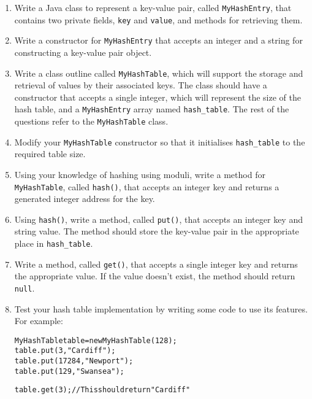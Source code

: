 \documentclass[11pt,a4paper]{report}
\begin{document}
\begin{enumerate}

\item Write a Java class to represent a key-value pair, called \texttt{MyHashEntry}, that contains two private fields, \texttt{key} and \texttt{value}, and methods for retrieving them.

\item Write a constructor for \texttt{MyHashEntry} that accepts an integer and a string for constructing a key-value pair object.

\item Write a class outline called \texttt{MyHashTable}, which will support the storage and retrieval of values by their associated keys. The class should have a constructor that accepts a single integer, which will represent the size of the hash table, and a \texttt{MyHashEntry} array named \texttt{hash\_table}. The rest of the questions refer to the \texttt{MyHashTable} class.

\item Modify your \texttt{MyHashTable} constructor so that it initialises \texttt{hash\_table} to the required table size.

\item Using your knowledge of hashing using moduli, write a method for \texttt{MyHashTable}, called \texttt{hash()}, that accepts an integer key and returns a generated integer address for the key.

\item Using \texttt{hash()}, write a method, called \texttt{put()}, that accepts an integer key and string value. The method should store the key-value pair in the appropriate place in \texttt{hash\_table}.

\item Write a method, called \texttt{get()}, that accepts a single integer key and returns the appropriate value. If the value doesn't exist, the method should return \texttt{null}.

\item Test your hash table implementation by writing some code to use its features. For example:
\begin{alltt}
MyHashTable table = new MyHashTable(128);
table.put(3, "Cardiff");
table.put(17284, "Newport");
table.put(129, "Swansea");

table.get(3); // This should return "Cardiff"
\end{alltt}

\end{enumerate}
\end{document}
